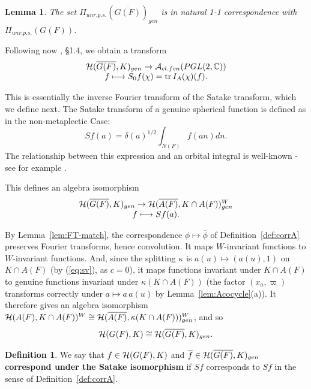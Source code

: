 \documentclass[12pt,letterpaper]{book}
\theoremstyle{plain}
\newtheorem{lemma}[theorem]{Lemma}
\theoremstyle{definition}
\newtheorem{definition}[theorem]{Definition}
\theoremstyle{remark}
\theoremstyle{remark}
\newcommand{\tr}{\operatorname{tr}}
\begin{document}
\begin{lemma} The set $\Pi_{unr.p.s.}(\overline{G(F)})_{gen}$ is
in natural 1-1 correspondence with
$\Pi_{unr.p.s.}(G(F))$.
\end{lemma}

Following now \cite{J}, \S 1.4, we obtain a transform
\begin{equation}
\begin{array}{c}
{\cal{H}}(\overline{G(F)},K)_{gen}\rightarrow
{\cal{A}}_{cl.fcn}(PGL(2,{\mathbb{C}}))\\
f\longmapsto S_0 f(\chi)=\tr I_A(\chi)(f).
\end{array}
\end{equation}

This is essentially the inverse Fourier transform of the Satake
transform, which we define next. The Satake transform of a
genuine spherical function is defined as in the non-metaplectic Case:
\begin{equation}
Sf(a)=\delta(a)^{1/2}\int_{N(F)}f(an)dn.
\end{equation}
The relationship between this expression and an orbital integral
is well-known - see for example \cite{C}.

This defines an algebra isomorphism
\begin{equation}
\begin{array}{c}
{\cal{H}}(\overline{G(F)},K)_{gen}\rightarrow
{\cal{H}}(\overline{A(F)},K\cap A(F))^W_{gen}\\
f\longmapsto Sf(a).
\end{array}
\end{equation}

By Lemma~\ref{lem:FT-match}, the correspondence $\phi\mapsto\overline\phi$
of Definition~\ref{def:corrA} preserves Fourier transforms, hence
convolution. It maps $W$-invariant functions to $W$-invariant functions.
And, since the splitting $\kappa$ is $a(u)\mapsto(a(u),1)$ on $K\cap A(F)$
(by (\ref{eq:sv}), as $c=0$), it maps functions invariant under
$K\cap A(F)$ to genuine functions invariant under $\kappa(K\cap A(F))$
(the factor $(x_a,\varpi)$ transforms correctly under $a\mapsto a\,a(u)$
by Lemma~\ref{lem:Acocycle}(a)). It therefore gives an algebra isomorphism
${\cal{H}}(A(F),K\cap A(F))^W\cong
{\cal{H}}(\overline{A(F)},\kappa(K\cap A(F)))^W_{gen}$, and so
\[
{\cal{H}}(G(F),K)\cong{\cal{H}}(\overline{G(F)},K)_{gen}.
\]

\begin{definition}\label{def:satake-corr}
We say that $f\in{\cal H}(G(F),K)$ and
$\overline f\in{\cal H}(\overline{G(F)},K)_{gen}$ {\bf correspond under
the Satake isomorphism} if $Sf$ corresponds to $S\overline{f}$ in the
sense of Definition~\ref{def:corrA}.
\end{definition}
\end{document}

